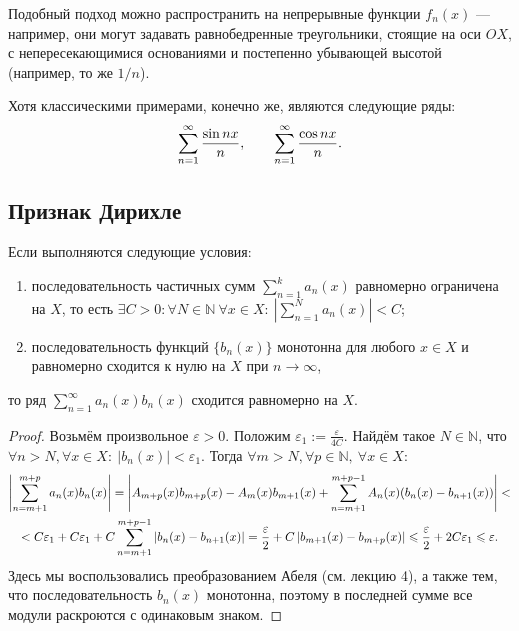 \documentclass[a4paper, 12pt]{article}
\begin{document}
	Подобный подход можно распространить на непрерывные функции $f_n(x)$ --- например, они могут задавать равнобедренные треугольники, стоящие на оси $OX$, с непересекающимися основаниями и постепенно убывающей высотой (например, то же $1/n$).
	
	Хотя классическими примерами, конечно же, являются следующие ряды:
	$$
	\sum\limits_{n=1}^{\infty} \frac{\sin nx}{n}, \qquad \sum\limits_{n=1}^{\infty} \frac{\cos nx}{n}.
	$$

	\subsection{Признак Дирихле}	
	
	\begin{Test}
		Если выполняются следующие условия:
		\begin{enumerate}
			\item  последовательность частичных сумм $\sum\limits_{n = 1}^k a_n(x) $ равномерно ограничена на $X$, то есть $\exists C>0 : \forall N\in \mathbb{N} \ \forall x \in X: \  \left| \sum\limits_{n = 1}^N a_n(x)\right|  <C$;
			
			\item  последовательность функций $\{b_n(x)\}$ монотонна для любого $x \in X$ и равномерно сходится к нулю на $X$ при $n \to \infty$,
		\end{enumerate}
		то ряд $\sum\limits_{n = 1}^\infty a_n(x) b_n(x)$ сходится равномерно на $X$.
	\end{Test}
	
	\begin{proof}
		Возьмём произвольное $\varepsilon>0$. Положим $\varepsilon_1 := \frac{\varepsilon}{4C}$. Найдём такое $N\in \mathbb{N}$, что $\forall n > N, \forall x \in X: \  \left| b_n(x) \right| < \varepsilon_1.$
		Тогда $\forall m>N, \forall p \in \mathbb{N}, \ \forall x \in X:$
		\begin{multline}
		\left| \sum\limits_{n = m+1}^{m+p} a_n(x) b_n(x)\right| = \left| A_{m+p}(x)b_{m+p}(x) - A_{m}(x)b_{m+1}(x)+ \sum\limits_{n = m+1}^{m+p-1} A_n(x)( b_n(x)-b_{n+1}(x)) \right| <\\
		< C\varepsilon_1+C\varepsilon_1+C\sum\limits_{n = m+1}^{m+p-1} | b_n(x)-b_{n+1}(x)|=\frac{\varepsilon}{2} + C\left|b_{m+1}(x) - b_{m+p}(x) \right| \leqslant \frac{\varepsilon}{2} + 2C\varepsilon_1 \leqslant \varepsilon.
		\end{multline}
		Здесь мы воспользовались преобразованием Абеля (см. лекцию 4), а также тем, что последовательность $b_n(x)$ монотонна, поэтому в последней сумме все модули раскроются с одинаковым знаком.
	\end{proof}
	
\end{document}
